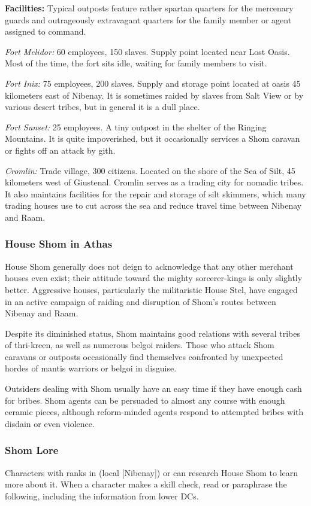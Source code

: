\textbf{Facilities:} Typical outposts feature rather spartan quarters for the mercenary guards and outrageously extravagant quarters for the family member or agent assigned to command.

\textit{Fort Melidor:} 60 employees, 150 slaves. Supply point located near Lost Oasis. Most of the time, the fort sits idle, waiting for family members to visit.

\textit{Fort Inix:} 75 employees, 200 slaves. Supply and storage point located at oasis 45 kilometers east of Nibenay. It is sometimes raided by slaves from Salt View or by various desert tribes, but in general it is a dull place.

\textit{Fort Sunset:} 25 employees. A tiny outpost in the shelter of the Ringing Mountains. It is quite impoverished, but it occasionally services a Shom caravan or fights off an attack by gith.

\textit{Cromlin:} Trade village, 300 citizens. Located on the shore of the Sea of Silt, 45 kilometers west of Giustenal. Cromlin serves as a trading city for nomadic tribes. It also maintains facilities for the repair and storage of silt skimmers, which many trading houses use to cut across the sea and reduce travel time between Nibenay and Raam.


\subsubsection{House Shom in Athas}
House Shom generally does not deign to acknowledge that any other merchant houses even exist; their attitude toward the mighty sorcerer-kings is only slightly better. Aggressive houses, particularly the militaristic House Stel, have engaged in an active campaign of raiding and disruption of Shom's routes between Nibenay and Raam.

Despite its diminished status, Shom maintains good relations with several tribes of thri-kreen, as well as numerous belgoi raiders. Those who attack Shom caravans or outposts occasionally find themselves confronted by unexpected hordes of mantis warriors or belgoi in disguise. 

Outsiders dealing with Shom usually have an easy time if they have enough cash for bribes. Shom agents can be persuaded to almost any course with enough ceramic pieces, although reform-minded agents respond to attempted bribes with disdain or even violence.

\subsubsection{Shom Lore}
Characters with ranks in  (local [Nibenay]) or  can research House Shom to learn more about it. When a character makes a skill check, read or paraphrase the following, including the information from lower DCs.

